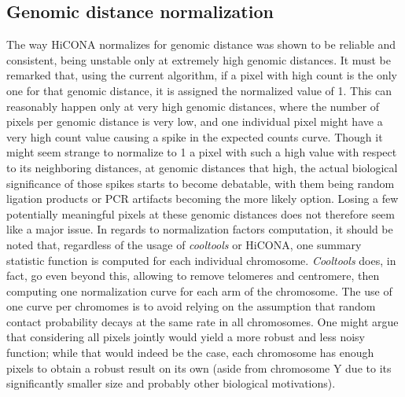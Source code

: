 \subsection{Genomic distance normalization}
The way HiCONA normalizes for genomic distance was shown to be reliable and consistent, being unstable only at extremely high genomic distances. It must be remarked that, using the current algorithm, if a pixel with high count is the only one for that genomic distance, it is assigned the normalized value of 1. This can reasonably happen only at very high genomic distances, where the number of pixels per genomic distance is very low, and one individual pixel might have a very high count value causing a spike in the expected counts curve. Though it might seem strange to normalize to 1 a pixel with such a high value with respect to its neighboring distances, at genomic distances that high, the actual biological significance of those spikes starts to become debatable, with them being random ligation products or PCR artifacts becoming the more likely option. Losing a few potentially meaningful pixels at these genomic distances does not therefore seem like a major issue. In regards to normalization factors computation, it should be noted that, regardless of the usage of \textit{cooltools} or HiCONA, one summary statistic function is computed for each individual chromosome. \textit{Cooltools} does, in fact, go even beyond this, allowing to remove telomeres and centromere, then computing one normalization curve for each arm of the chromosome. The use of one curve per chromomes is to avoid relying on the assumption that random contact probability decays at the same rate in all chromosomes. One might argue that considering all pixels jointly would yield a more robust and less noisy function; while that would indeed be the case, each chromosome has enough pixels to obtain a robust result on its own (aside from chromosome Y due to its significantly smaller size and probably other biological motivations).

